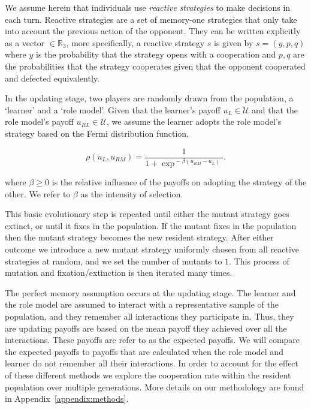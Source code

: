 \documentclass[11pt]{article}
\newcommand{\R}{\mathbb{R}}
\theoremstyle{plainCl1}
\theoremstyle{plainCl2}
\begin{document}
We assume herein that individuals use \textit{reactive strategies} to make
decisions in each turn. Reactive strategies are a set of memory-one strategies
that only take into account the previous action of the opponent. They can be
written explicitly as a vector \(\in \R_{3}\), more specifically, a reactive
strategy \(s\) is given by \(s=(y, p, q)\) where \(y\) is the probability that
the strategy opens with a cooperation and \(p, q\) are the probabilities that
the strategy cooperates given that the opponent cooperated and defected
equivalently.

In the updating stage, two players are randomly drawn from the population, a
`learner' and a `role model'. Given that the learner's payoff $u_L\!\in\!
\mathcal{U}$ and that the role model's payoff $u_{RL}\!\in\! \mathcal{U}$, we
assume the learner adopts the role model's strategy based on the Fermi
distribution function,

\begin{equation} \label{Eq:rho}
  \rho(u_{L}, u_{RM}) = \frac{1}{1\!+\! \exp^{\!-\!\beta (u_{RM}\!-\!u_{L})}}.
\end{equation}

where $\beta\!\ge\!0$ is the relative influence of the payoffs on adopting the 
strategy of the other. We refer to $\beta$ as the intensity of selection.

This basic evolutionary step is repeated until either the mutant strategy goes
extinct, or until it fixes in the population. If the mutant fixes in the
population then the mutant strategy becomes the new resident strategy. After
either outcome we introduce a new mutant strategy uniformly chosen from all
reactive strategies at random, and we set the number of mutants to $1$. This
process of mutation and fixation/extinction is then iterated many times.

The perfect memory assumption occurs at the updating stage. The learner and the
role model are assumed to interact with a representative sample of the
population, and they remember all interactions they participate in. Thus, they
are updating payoffs are based on the mean payoff they achieved over all the
interactions. These payoffs are refer to as the expected payoffs. We will
compare the expected payoffs to payoffs that are calculated when the role model
and learner do not remember all their interactions. In order to account for the
effect of these different methods we explore the cooperation rate within the
resident population over multiple generations. More details on our methodology
are found in Appendix~\ref{appendix:methods}.
\end{document}
